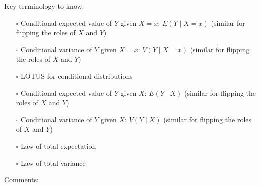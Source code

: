 \documentclass[
  letterpaper,
]{scrbook}
\providecommand{\tightlist}{%
  \setlength{\itemsep}{0pt}\setlength{\parskip}{0pt}}\usepackage{longtable,booktabs,array}
\begin{document}
Key terminology to know:

\begin{itemize}
\tightlist
\item[$\square$]
  Conditional expected value of \(Y\) given \(X=x\): \(E(Y \mid X=x)\)
  (similar for flipping the roles of \(X\) and \(Y\))
\item[$\square$]
  Conditional variance of \(Y\) given \(X=x\): \(V(Y \mid X=x)\)
  (similar for flipping the roles of \(X\) and \(Y\))
\item[$\square$]
  LOTUS for conditional distributions
\item[$\square$]
  Conditional expected value of \(Y\) given \(X\): \(E(Y \mid X)\)
  (similar for flipping the roles of \(X\) and \(Y\))
\item[$\square$]
  Conditional variance of \(Y\) given \(X\): \(V(Y \mid X)\) (similar
  for flipping the roles of \(X\) and \(Y\))
\item[$\square$]
  Law of total expectation
\item[$\square$]
  Law of total variance
\end{itemize}

Comments:
\end{document}
